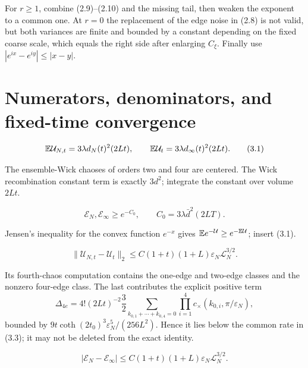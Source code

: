 \documentclass[11pt,a4paper]{article}
\newcommand{\eps}{\varepsilon}
\newcommand{\U}{\mathcal U}
\newcommand{\cth}{\operatorname{coth}}
\newcommand{\logN}{\mathcal L_N}
\begin{document}
\Because For $r\ge1$, combine (2.9)--(2.10) and the missing tail, then weaken
the exponent to a common one.  At $r=0$ the replacement of the edge noise in (2.8)
is not valid, but both variances are finite and bounded by a constant depending on
the fixed coarse scale, which equals the right side after enlarging $C_\xi$.  Finally
use $|e^{ix}-e^{iy}|\le|x-y|$.

\QedStep

\section{Numerators, denominators, and fixed-time convergence}


\[
 \E\U_{N,t}=3\lambda d_N(t)^2(2Lt),\qquad
 \E\U_t=3\lambda d_\infty(t)^2(2Lt).
\tag{3.1}
\]

\Because The ensemble-Wick chaoses of orders two and four are centered.  The Wick
recombination constant term is exactly $3d^2$; integrate the constant over volume
$2Lt$.

\[
 \mathcal E_N,\mathcal E_\infty
 \ge e^{-C_0},\qquad C_0=3\lambda\bar d^2(2LT).
\tag{3.2}
\]

\Because Jensen's inequality for the convex function $e^{-x}$ gives
$\E e^{-\U}\ge e^{-\E\U}$; insert (3.1).

\QedStep


\[
 \|\U_{N,t}-\U_t\|_2
 \le C(1+t)(1+L)\eps_N\logN^{3/2}.
\tag{3.3}
\]

\Because Its fourth-chaos computation contains the one-edge and two-edge classes
and the nonzero four-edge class.  The last contributes the explicit positive term
\[
 \Delta_{4e}=4!(2Lt)^{-2}\frac32
 \sum_{k_{0,1}+\cdots+k_{0,4}=0}
 \prod_{i=1}^4 c_\times(k_{0,i},\pi/\eps_N),
\tag{3.4}
\]
bounded by
$9t\cth(2t_0)^3\eps_N^5/(256L^2)$.  Hence it lies below the common rate in
(3.3); it may not be deleted from the exact identity.

\[
 |\mathcal E_N-\mathcal E_\infty|
 \le C(1+t)(1+L)\eps_N\logN^{3/2}.
\tag{3.5}
\]
\end{document}
